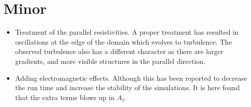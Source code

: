 \section{Minor}

\begin{itemize}[noitemsep,nolistsep]
    \item Treatment of the parallel resistivities.
        A proper treatment has resulted in oscillations at the edge of the domain which evolves to turbulence.
        The observed turbulence also has a different character as there are larger gradients, and more visible structures in the parallel direction.
    \item Adding electromagnetic effects.
        Although this has been reported to decrease the run time and increase the stability of the simulations.
        It is here found that the extra terms blows up in $A_\|$.
\end{itemize}

